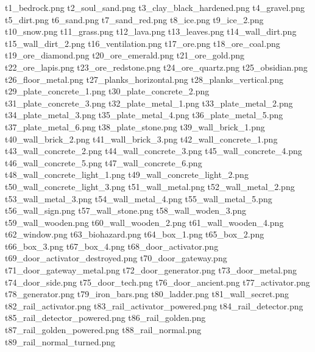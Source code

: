 t1_bedrock.png
t2_soul_sand.png
t3_clay_black_hardened.png
t4_gravel.png
t5_dirt.png
t6_sand.png
t7_sand_red.png
t8_ice.png
t9_ice_2.png
t10_snow.png
t11_grass.png
t12_lava.png
t13_leaves.png
t14_wall_dirt.png
t15_wall_dirt_2.png
t16_ventilation.png
t17_ore.png
t18_ore_coal.png
t19_ore_diamond.png
t20_ore_emerald.png
t21_ore_gold.png
t22_ore_lapis.png
t23_ore_redstone.png
t24_ore_quartz.png
t25_obsidian.png
t26_floor_metal.png
t27_planks_horizontal.png
t28_planks_vertical.png
t29_plate_concrete_1.png
t30_plate_concrete_2.png
t31_plate_concrete_3.png
t32_plate_metal_1.png
t33_plate_metal_2.png
t34_plate_metal_3.png
t35_plate_metal_4.png
t36_plate_metal_5.png
t37_plate_metal_6.png
t38_plate_stone.png
t39_wall_brick_1.png
t40_wall_brick_2.png
t41_wall_brick_3.png
t42_wall_concrete_1.png
t43_wall_concrete_2.png
t44_wall_concrete_3.png
t45_wall_concrete_4.png
t46_wall_concrete_5.png
t47_wall_concrete_6.png
t48_wall_concrete_light_1.png
t49_wall_concrete_light_2.png
t50_wall_concrete_light_3.png
t51_wall_metal.png
t52_wall_metal_2.png
t53_wall_metal_3.png
t54_wall_metal_4.png
t55_wall_metal_5.png
t56_wall_sign.png
t57_wall_stone.png
t58_wall_woden_3.png
t59_wall_wooden.png
t60_wall_wooden_2.png
t61_wall_wooden_4.png
t62_window.png
t63_biohazard.png
t64_box_1.png
t65_box_2.png
t66_box_3.png
t67_box_4.png
t68_door_activator.png
t69_door_activator_destroyed.png
t70_door_gateway.png
t71_door_gateway_metal.png
t72_door_generator.png
t73_door_metal.png
t74_door_side.png
t75_door_tech.png
t76_door_ancient.png
t77_activator.png
t78_generator.png
t79_iron_bars.png
t80_ladder.png
t81_wall_secret.png
t82_rail_activator.png
t83_rail_activator_powered.png
t84_rail_detector.png
t85_rail_detector_powered.png
t86_rail_golden.png
t87_rail_golden_powered.png
t88_rail_normal.png
t89_rail_normal_turned.png
